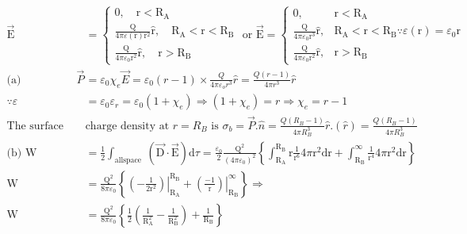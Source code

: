 \begin{enumerate}
\begin{answer}
\begin{align*}
		\overrightarrow{\mathrm{E}}&=\left\{\begin{array}{ll}0,\quad  \mathrm{r}<\mathrm{R}_{\mathrm{A}} \\ \frac{\mathrm{Q}}{4 \pi \varepsilon(\mathrm{r}) \mathrm{r}^{2}} \hat{\mathrm{r}},\quad  \mathrm{R}_{\mathrm{A}}<\mathrm{r}<\mathrm{R}_{\mathrm{B}} \\ \frac{\mathrm{Q}}{4 \pi \varepsilon_{0} \mathrm{r}^{2}} \hat{\mathrm{r}}, \quad \mathrm{r}>\mathrm{R}_{\mathrm{B}}\end{array}\right.\text{ or }\overrightarrow{\mathrm{E}}=\left\{\begin{array}{ll}0, & \mathrm{r}<\mathrm{R}_{\mathrm{A}} \\ \frac{\mathrm{Q}}{4 \pi \varepsilon_{0} \mathrm{r}^{3}} \hat{\mathrm{r}}, & \mathrm{R}_{\mathrm{A}}<\mathrm{r}<\mathrm{R}_{\mathrm{B}} \because \varepsilon(\mathrm{r})=\varepsilon_{0} \mathrm{r} \\ \frac{\mathrm{Q}}{4 \pi \varepsilon_{0} \mathrm{r}^{2}} \hat{\mathrm{r}}, & \mathrm{r}>\mathrm{R}_{\mathrm{B}}\end{array}\right.\\
		\text{(a) Polarisation }\vec{P}&=\varepsilon_{0} \chi_{e} \vec{E}=\varepsilon_{0}(r-1) \times \frac{Q}{4 \pi \varepsilon_{o} r^{3}} \hat{r}=\frac{Q(r-1)}{4 \pi r^{3}} \hat{r}\\
		\because \varepsilon&=\varepsilon_{0} \varepsilon_{r}=\varepsilon_{0}\left(1+\chi_{e}\right) \Rightarrow\left(1+\chi_{e}\right)=r \Rightarrow \chi_{e}=r-1\\
		\text{The surface bound }&\text{charge density at }r=R_{B}\text{ is }\sigma_{b}=\vec{P} . \hat{n}=\frac{Q\left(R_{B}-1\right)}{4 \pi R_{B}^{3}} \hat{r} .(\hat{r})=\frac{Q\left(R_{B}-1\right)}{4 \pi R_{B}^{3}}\\
		\text{(b) }\mathrm{W}&=\frac{1}{2} \int_{\text {allspace }}(\overrightarrow{\mathrm{D}} \cdot \overrightarrow{\mathrm{E}}) \mathrm{d} \tau=\frac{\varepsilon_{0}}{2} \frac{\mathrm{Q}^{2}}{\left(4 \pi \varepsilon_{0}\right)^{2}}\left\{\int_{\mathrm{R}_{\mathrm{A}}}^{\mathrm{R}_{\mathrm{B}}} \mathrm{r} \frac{1}{\mathrm{r}^{6}} 4 \pi \mathrm{r}^{2} \mathrm{dr}+\int_{\mathrm{R}_{\mathrm{B}}}^{\infty} \frac{1}{\mathrm{r}^{4}} 4 \pi \mathrm{r}^{2} \mathrm{dr}\right\}\\
		\mathrm{W}&=\frac{\mathrm{Q}^{2}}{8 \pi \varepsilon_{0}}\left\{\left.\left(-\frac{1}{2 \mathrm{r}^{2}}\right)\right|_{\mathrm{R}_{\mathrm{A}}} ^{\mathrm{R}_{\mathrm{B}}}+\left.\left(\frac{-1}{\mathrm{r}}\right)\right|_{\mathrm{R}_{\mathrm{B}}} ^{\infty}\right\} \Rightarrow\\ \mathrm{W}&=\frac{\mathrm{Q}^{2}}{8 \pi \varepsilon_{0}}\left\{\frac{1}{2}\left(\frac{1}{\mathrm{R}_{\mathrm{A}}^{2}}-\frac{1}{\mathrm{R}_{\mathrm{B}}^{2}}\right)+\frac{1}{\mathrm{R}_{\mathrm{B}}}\right\}

\end{align*}
\end{answer}
\end{enumerate}
